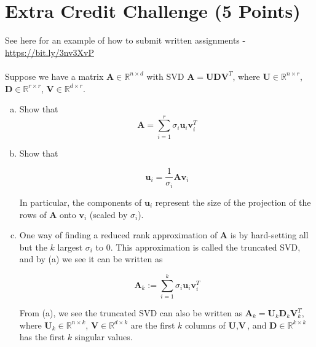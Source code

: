 \section{Extra Credit Challenge (5 Points)}
See here for an example of how to submit written assignments - \href{https://bit.ly/3nv3XvP}{https://bit.ly/3nv3XvP}\\~\\

Suppose we have a matrix $\textbf{A} \in \mathbb{R}^{n \times d}$ with SVD $\textbf{A} = \textbf{U} \textbf{D}\textbf{V}^{T}$, where $\textbf{U} \in \mathbb{R}^{n \times r}$, $\textbf{D} \in \mathbb{R}^{r \times r}$, $\textbf{V} \in \mathbb{R}^{d \times r}.$
\begin{enumerate}[(a)]
    \item  {} Show that  
    \begin{equation}
    \textbf{A} = \sum_{i=1}^{r} \sigma_{i} \textbf{u}_{i} \textbf{v}_{i}^{T} 
    \label{svd_sum}
    \end{equation}
    
    \newpage
    
    \item {} Show that 
    
    \begin{equation}
    \textbf{u}_i = \frac{1}{\sigma_{i}} \textbf{A}\textbf{v}_{i}
    \label{what_is_u}
    \end{equation}
    
    In particular, the components of $\textbf{u}_i$ represent the size of the projection of the rows of $\textbf{A}$ onto $\textbf{v}_i$ (scaled by $\sigma_{i}$).
    
    \newpage
    
    \item {} One way of finding a reduced rank approximation of $\textbf{A}$ is by hard-setting all but the $k$ largest $\sigma_i$ to 0. This approximation is called the truncated SVD, and by (a) we see it can be written as 
   
    \begin{equation}
    \textbf{A}_{k} := \sum_{i=1}^{k} \sigma_{i} \textbf{u}_{i} \textbf{v}_{i}^{T}
    \label{reduced_svd_trunc}
    \end{equation}
   
    From (a), we see the truncated SVD can also be written as $\textbf{A}_{k} = \textbf{U}_k \textbf{D}_k \textbf{V}^{T}_k$, where $\textbf{U}_k \in \mathbb{R}^{n \times k}$, $\textbf{V} \in \mathbb{R}^{d \times k}$ are the first $k$ columns of $\textbf{U}, \textbf{V}$, and $\textbf{D} \in \mathbb{R}^{k \times k}$ has the first $k$ singular values.\newline
    

\end{enumerate}
